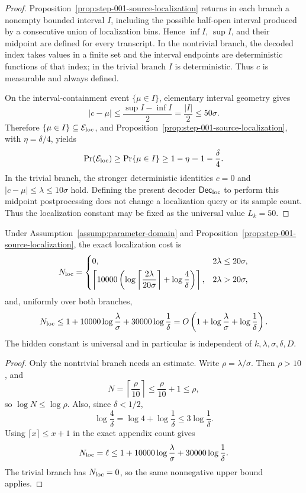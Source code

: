 \begin{proof}
Proposition~\ref{prop:step-001-source-localization} returns in each branch a nonempty bounded interval \(I\), including the possible half-open interval produced by a consecutive union of localization bins. Hence \(\inf I\), \(\sup I\), and their midpoint are defined for every transcript. In the nontrivial branch, the decoded index takes values in a finite set and the interval endpoints are deterministic functions of that index; in the trivial branch \(I\) is deterministic. Thus \(c\) is measurable and always defined.

On the interval-containment event \(\{\mu\in I\}\), elementary interval geometry gives
\[
|c-\mu|
\leq\frac{\sup I-\inf I}{2}
=\frac{|I|}{2}
\leq50\sigma.
\]
Therefore \(\{\mu\in I\}\subseteq\mathcal E_{\rm loc}\), and Proposition~\ref{prop:step-001-source-localization}, with \(\eta=\delta/4\), yields
\[
\Pr(\mathcal E_{\rm loc})
\geq\Pr\{\mu\in I\}
\geq1-\eta
=1-\frac\delta4.
\]
In the trivial branch, the stronger deterministic identities \(c=0\) and \(|c-\mu|\leq\lambda\leq10\sigma\) hold. Defining the present decoder \(\mathsf{Dec}_{\rm loc}\) to perform this midpoint postprocessing does not change a localization query or its sample count. Thus the localization constant may be fixed as the universal value \(L_k=50\).
\end{proof}

\begin{lemma}\label{lem:step-001-cost}
Under Assumption~\ref{assump:parameter-domain} and Proposition~\ref{prop:step-001-source-localization}, the exact localization cost is
\[
N_{\rm loc}=
\begin{cases}
0, & 2\lambda\leq20\sigma,\\[0.35em]
\left\lceil10000\left(
\log\left\lceil\dfrac{2\lambda}{20\sigma}\right\rceil
+\log\dfrac4\delta
\right)\right\rceil, & 2\lambda>20\sigma,
\end{cases}
\]
and, uniformly over both branches,
\[
N_{\rm loc}
\leq1+10000\log\frac\lambda\sigma
+30000\log\frac1\delta
=O\left(1+\log\frac\lambda\sigma+\log\frac1\delta\right).
\]
The hidden constant is universal and in particular is independent of \(k,\lambda,\sigma,\delta,D\).
\end{lemma}

\begin{proof}
Only the nontrivial branch needs an estimate. Write \(\rho=\lambda/\sigma\). Then \(\rho>10\), and
\[
N=\left\lceil\frac\rho{10}\right\rceil
\leq\frac\rho{10}+1
\leq\rho,
\]
so \(\log N\leq\log\rho\). Also, since \(\delta<1/2\),
\[
\log\frac4\delta
=\log4+\log\frac1\delta
\leq3\log\frac1\delta.
\]
Using \(\lceil x\rceil\leq x+1\) in the exact appendix count gives
\[
N_{\rm loc}=\ell
\leq1+10000\log\frac\lambda\sigma
+30000\log\frac1\delta.
\]
The trivial branch has \(N_{\rm loc}=0\), so the same nonnegative upper bound applies.
\end{proof}

